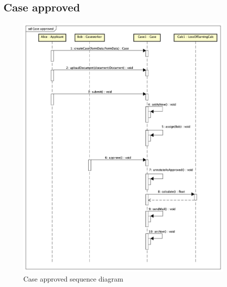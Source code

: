 \subsection{Case approved}
\begin{figure}[htb!]
    \centering
    \includegraphics[width=0.95\textwidth]{img/sd-case-approved.png}
    \caption{Case approved sequence diagram}
    \label{fig:my_label}
\end{figure}

\newpage
